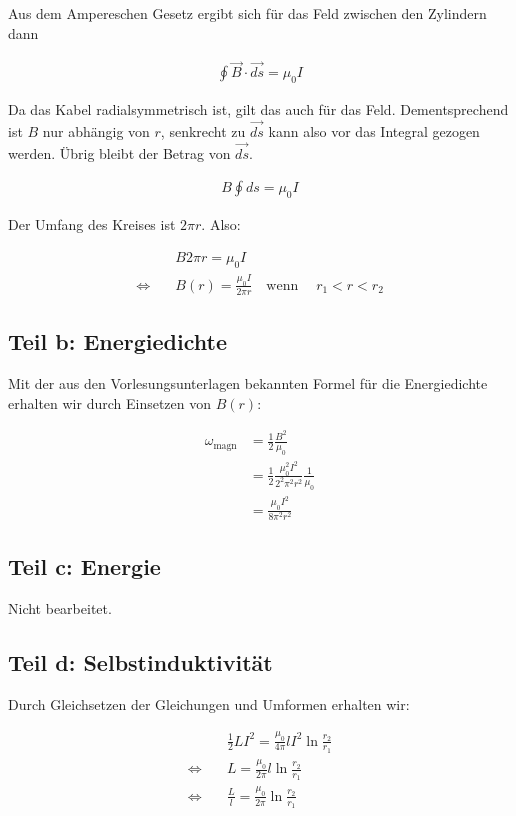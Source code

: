 \documentclass[a4paper,german,12pt,smallheadings]{scrartcl}
\begin{document}
Aus dem Ampereschen Gesetz ergibt sich für das Feld zwischen den Zylindern dann

\begin{align*}
  \oint \vec{B} \cdot \vec{ds} = \mu_0 I
\end{align*}

Da das Kabel radialsymmetrisch ist, gilt das auch für das Feld. Dementsprechend
ist $B$ nur abhängig von $r$, senkrecht zu $\vec{ds}$ kann also vor das
Integral gezogen werden. Übrig bleibt der Betrag von $\vec{ds}$.

\begin{align*}
  B \oint ds = \mu_0 I
\end{align*}

Der Umfang des Kreises ist $2 \pi r$. Also:

\begin{align*}
  &B 2 \pi r = \mu_0 I \\
  \Leftrightarrow\quad &B(r) = \frac{\mu_0 I}{2 \pi r} \quad \text{wenn}\quad\; r_1 < r < r_2
\end{align*}

\subsection*{Teil b: Energiedichte}

Mit der aus den Vorlesungsunterlagen bekannten Formel für die Energiedichte
erhalten wir durch Einsetzen von $B(r)$:

\begin{align*}
  \omega_{\text{magn}} &= \frac{1}{2} \frac{B^2}{\mu_0} \\
                       &= \frac{1}{2} \frac{\mu_0^2 I^2}{2^2 \pi^2 r^2} \frac{1}{\mu_0} \\
                       &= \frac{\mu_0 I^2}{8 \pi^2 r^2}
\end{align*}

\subsection*{Teil c: Energie}

Nicht bearbeitet.

\subsection*{Teil d: Selbstinduktivität}

Durch Gleichsetzen der Gleichungen und Umformen erhalten wir:

\begin{align*}
  &\frac{1}{2}LI^2 = \frac{\mu_0}{4 \pi} l I^2  \ln \frac{r_2}{r_1} \\
  \Leftrightarrow\quad&L = \frac{\mu_0}{2 \pi} l  \ln \frac{r_2}{r_1} \\
  \Leftrightarrow\quad&\frac{L}{l} = \frac{\mu_0}{2 \pi} \ln \frac{r_2}{r_1}
\end{align*}
\end{document}
